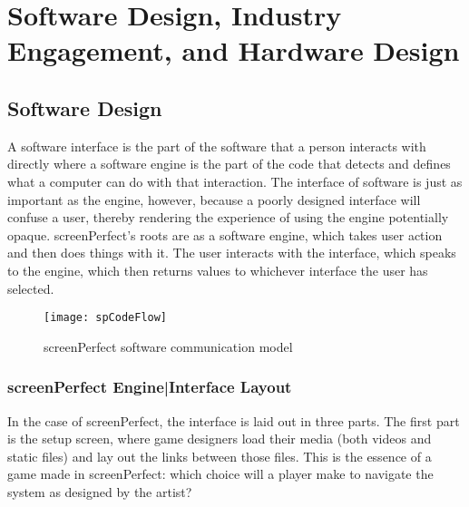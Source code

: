 \chapter{Software Design, Industry Engagement, and Hardware Design}\thispagestyle{empty} %
\label{Chapter3} %



\section{Software Design}
A software interface is the part of the software that a person interacts with directly where a software engine is the part of the code that detects and defines what a computer can do with that interaction. 
The interface of software is just as important as the engine, however, because a poorly designed interface will confuse a user, thereby rendering the experience of using the engine potentially opaque. 
screenPerfect's roots are as a software engine, which takes user action and then does things with it. The user interacts with the interface, which speaks to the engine, which then returns values to whichever interface the user has selected.

\newpage
\begin{figure}[h!]
 \centering
 \texttt{[image: spCodeFlow]}
 \caption{screenPerfect software communication model}
\end{figure}
\newpage

\subsection{screenPerfect Engine|Interface Layout}
In the case of screenPerfect, the interface is laid out in three parts. The first part is the setup screen, where game designers load their media (both videos and static files) and lay out the links between those files. This is the essence of a game made in screenPerfect: which choice will a player make to navigate the system as designed by the artist?

